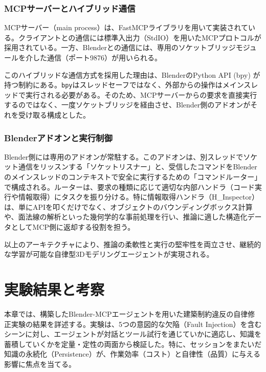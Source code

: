 \documentclass[dvipdfmx, a4paper, 9pt]{deimj}
\begin{document}
\subsubsection{MCPサーバーとハイブリッド通信}

MCPサーバー（main process）は、FastMCPライブラリを用いて実装されている。クライアントとの通信には標準入出力（StdIO）を用いたMCPプロトコルが採用されている。一方、Blenderとの通信には、専用のソケットブリッジモジュールを介した通信（ポート9876）が用いられる。

このハイブリッドな通信方式を採用した理由は、BlenderのPython API (bpy) が持つ制約にある。\texttt{bpy}はスレッドセーフではなく、外部からの操作はメインスレッドで実行される必要がある。そのため、MCPサーバーからの要求を直接実行するのではなく、一度ソケットブリッジを経由させ、Blender側のアドオンがそれを受け取る構成とした。

\subsubsection{Blenderアドオンと実行制御}

Blender側には専用のアドオンが常駐する。このアドオンは、別スレッドでソケット通信をリッスンする「ソケットリスナー」と、受信したコマンドをBlenderのメインスレッドのコンテキストで安全に実行するための「コマンドルーター」で構成される。ルーターは、要求の種類に応じて適切な内部ハンドラ（コード実行や情報取得）にタスクを振り分ける。特に情報取得ハンドラ（H\_Inspector）は、単にAPIを叩くだけでなく、オブジェクトのバウンディングボックス計算や、面法線の解析といった幾何学的な事前処理を行い、推論に適した構造化データとしてMCP側に返却する役割を担う。

以上のアーキテクチャにより、推論の柔軟性と実行の堅牢性を両立させ、継続的な学習が可能な自律型3Dモデリングエージェントが実現される。

\section{実験結果と考察}

本章では、構築したBlender-MCPエージェントを用いた建築制約違反の自律修正実験の結果を詳述する。実験は、5つの意図的な欠陥（Fault Injection）を含むシーンに対し、エージェントが対話とツール試行を通じていかに適応し、知識を蓄積していくかを定量・定性の両面から検証した。特に、セッションをまたいだ知識の永続化（Persistence）が、作業効率（コスト）と自律性（品質）に与える影響に焦点を当てる。
\end{document}
